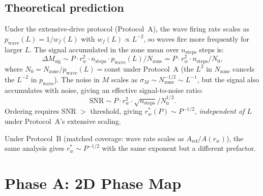 \documentclass[twocolumn,10pt]{article}
\begin{document}
\subsection{Theoretical prediction}

Under the extensive-drive protocol (Protocol~A), the wave firing rate scales as
$p_\mathrm{wave}(L)=1/w_f(L)$ with $w_f(L)\propto L^{-2}$, so waves fire more
frequently for larger $L$.
The signal accumulated in the zone mean over $n_\mathrm{steps}$ steps is:
\begin{equation}
  \Delta M_\mathrm{sig} \sim P \cdot r_w^2 \cdot n_\mathrm{steps}
  \cdot p_\mathrm{wave}(L) / N_\mathrm{zone}
  = P \cdot r_w^2 \cdot n_\mathrm{steps} / N_0,
  \label{eq:signal}
\end{equation}
where $N_0 = N_\mathrm{zone}/p_\mathrm{wave}(L) = \mathrm{const}$ under
Protocol~A (the $L^2$ in $N_\mathrm{zone}$ cancels the $L^{-2}$ in
$p_\mathrm{wave}$).
The noise in $M$ scales as $\sigma_M\sim N_\mathrm{zone}^{-1/2}\sim L^{-1}$,
but the signal also accumulates with noise, giving an effective
signal-to-noise ratio:
\begin{equation}
  \mathrm{SNR} \sim P \cdot r_w^2 \cdot \sqrt{n_\mathrm{steps}} / N_0^{1/2}.
  \label{eq:snr}
\end{equation}
Ordering requires SNR $>$ threshold, giving $r_w^*(P)\sim P^{-1/2}$,
\emph{independent of $L$} under Protocol~A's extensive scaling.

Under Protocol~B (matched coverage: wave rate scales as $A_\mathrm{ref}/A(r_w)$),
the same analysis gives $r_w^*\sim P^{-1/2}$ with the same exponent
but a different prefactor.

\section{Phase A: 2D Phase Map}
\end{document}
